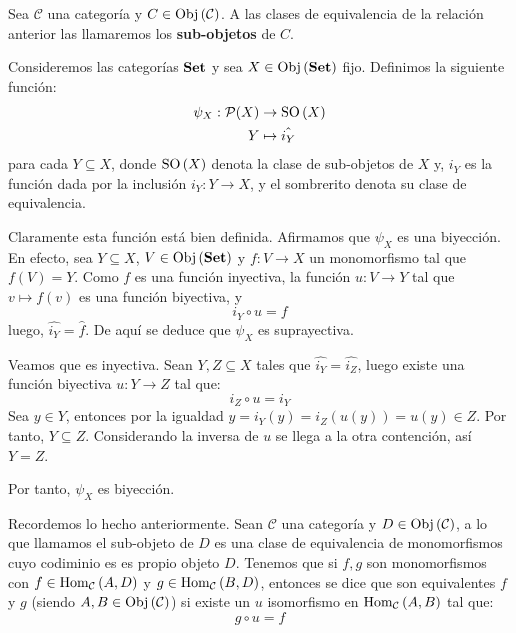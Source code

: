 \documentclass[12pt]{report}
\theoremstyle{largebreak}
\newcommand\cf[3]{\ensuremath{#1:#2\rightarrow#3}}
\newcommand{\Obj}[1]{\ensuremath{\textup{Obj}\left(#1\right)}}
\newcommand{\Hom}[3]{\ensuremath{\textup{Hom}_{#1}\left(#2,#3\right)}}
\newcommand{\Cat}[1]{\ensuremath{\textup{\textbf{#1}}}}
\newcommand{\SO}[1]{\ensuremath{\textup{SO}\left(#1\right)}}
\begin{document}
    \begin{mydef}
        Sea $\mathcal{C}$ una categoría y $C\in\Obj{\mathcal{C}}$. A las clases de equivalencia de la relación anterior las llamaremos los \textbf{sub-objetos} de $C$.
    \end{mydef}

    \begin{exa}
        Consideremos las categorías $\Cat{Set}$ y sea $X\in\Obj{\Cat{Set}}$ fijo. Definimos la siguiente función:
        \begin{equation*}
            \begin{split}
                \psi_X:\mathcal{P}(X)&\rightarrow \SO{X}\\
                Y&\mapsto \hat{i_Y}\\
            \end{split}
        \end{equation*}
        para cada $Y\subseteq X$, donde $\SO{X}$ denota la clase de sub-objetos de $X$ y, $i_Y$ es la función dada por la inclusión $\cf{i_Y}{Y}{X}$, y el sombrerito denota su clase de equivalencia.
    \end{exa}

    \begin{sol}
        Claramente esta función está bien definida. Afirmamos que $\psi_X$ es una biyección. En efecto, sea $Y\subseteq X$, $V\in\Obj{\Cat{Set}}$ y $\cf{f}{V}{X}$ un monomorfismo tal que $f(V)=Y$. Como $f$ es una función inyectiva, la función $\cf{u}{V}{Y}$ tal que $v\mapsto f(v)$ es una función biyectiva, y
        \begin{equation*}
            i_Y\circ u=f
        \end{equation*}
        luego, $\hat{i_Y}=\hat{f}$. De aquí se deduce que $\psi_X$ es suprayectiva.

        Veamos que es inyectiva. Sean $Y,Z\subseteq X$ tales que $\hat{i_Y}=\hat{i_Z}$, luego existe una función biyectiva $\cf{u}{Y}{Z}$ tal que:
        \begin{equation*}
            i_Z\circ u = i_Y
        \end{equation*}
        Sea $y\in Y$, entonces por la igualdad $y=i_Y(y)=i_Z(u(y))=u(y)\in Z$. Por tanto, $Y\subseteq Z$. Considerando la inversa de $u$ se llega a la otra contención, así $Y=Z$.

        Por tanto, $\psi_X$ es biyección.
    \end{sol}

    Recordemos lo hecho anteriormente. Sean $\mathcal{C}$ una categoría y $D\in\Obj{\mathcal{C}}$, a lo que llamamos el sub-objeto de $D$ es una clase de equivalencia de monomorfismos cuyo codiminio es es propio objeto $D$. Tenemos que si $f,g$ son monomorfismos con $f\in\Hom{\mathcal{C}}{A}{D}$ y $g\in\Hom{\mathcal{C}}{B}{D}$, entonces se dice que son equivalentes $f$ y $g$ (siendo $A,B\in\Obj{\mathcal{C}}$) si existe un $u$ isomorfismo en $\Hom{\mathcal{C}}{A}{B}$ tal que:
    \begin{equation*}
        g\circ u = f
    \end{equation*}
\end{document}
